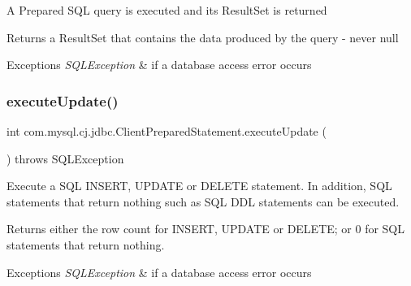 A Prepared S\+QL query is executed and its Result\+Set is returned

\begin{DoxyReturn}{Returns}
a Result\+Set that contains the data produced by the query -\/ never null
\end{DoxyReturn}

\begin{DoxyExceptions}{Exceptions}
{\em S\+Q\+L\+Exception} & if a database access error occurs \\
\hline
\end{DoxyExceptions}
\mbox{\label{classcom_1_1mysql_1_1cj_1_1jdbc_1_1_client_prepared_statement_a71cd036bccd4ec78a85b861e4a548e1f}} 
\subsubsection{\texorpdfstring{execute\+Update()}{executeUpdate()}}
{\footnotesize\ttfamily int com.\+mysql.\+cj.\+jdbc.\+Client\+Prepared\+Statement.\+execute\+Update (\begin{DoxyParamCaption}{ }\end{DoxyParamCaption}) throws S\+Q\+L\+Exception}

Execute a S\+QL I\+N\+S\+E\+RT, U\+P\+D\+A\+TE or D\+E\+L\+E\+TE statement. In addition, S\+QL statements that return nothing such as S\+QL D\+DL statements can be executed.

\begin{DoxyReturn}{Returns}
either the row count for I\+N\+S\+E\+RT, U\+P\+D\+A\+TE or D\+E\+L\+E\+TE; or 0 for S\+QL statements that return nothing.
\end{DoxyReturn}

\begin{DoxyExceptions}{Exceptions}
{\em S\+Q\+L\+Exception} & if a database access error occurs \\
\hline
\end{DoxyExceptions}
\mbox{\label{classcom_1_1mysql_1_1cj_1_1jdbc_1_1_client_prepared_statement_a6eec75c24c92ec36c85fc467e3f25512}} 

